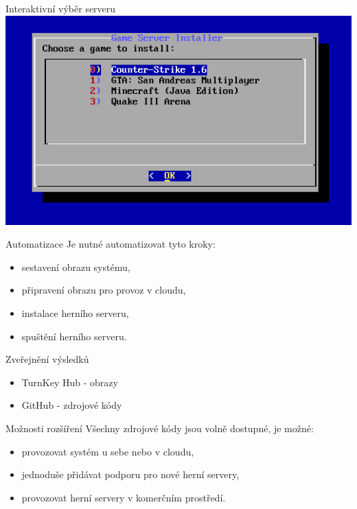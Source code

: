 \documentclass[czech,aspectratio=169]{beamer}
\begin{document}
  \begin{frame}{Interaktivní výběr serveru}
    \centering
    \includegraphics[width=0.7\paperwidth]{gameservers}
  \end{frame}

  \begin{frame}{Automatizace}
    Je nutné automatizovat tyto kroky:
    \begin{itemize}
      \item sestavení obrazu systému, \pause
      \item připravení obrazu pro provoz v cloudu, \pause
      \item instalace herního serveru, \pause
      \item spuštění herního serveru.
    \end{itemize}
  \end{frame}

  \begin{frame}{Zveřejnění výsledků}
    \begin{itemize}
      \item TurnKey Hub - obrazy
      \item GitHub - zdrojové kódy
    \end{itemize}
  \end{frame}

  \begin{frame}{Možnosti rozšíření}
    Všechny zdrojové kódy jsou volně dostupné, je možné:
    \begin{itemize}
      \item provozovat systém u sebe nebo v cloudu,
      \item jednoduše přidávat podporu pro nové herní servery,
      \item provozovat herní servery v komerčním prostředí.
    \end{itemize}
  \end{frame}
\end{document}
